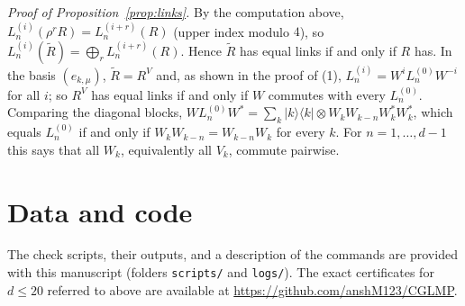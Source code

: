 \documentclass[11pt]{amsart}
\theoremstyle{definition}
\theoremstyle{remark}
\begin{document}
\emph{Proof of Proposition~\ref{prop:links}.} By the computation above, $L^{(i)}_n(\rho^rR)=L^{(i+r)}_n(R)$ (upper index modulo
$4$), so $L^{(i)}_n(\widetilde R)=\bigoplus_rL^{(i+r)}_n(R)$. Hence $\widetilde R$ has equal links if and only if $R$ has.
In the basis $(e_{k,\mu})$, $\widetilde R=R^V$ and, as shown in the proof of (1), $L^{(i)}_n=W^iL^{(0)}_nW^{-i}$ for all $i$;
so $R^V$ has equal links if and only if $W$ commutes with every $L^{(0)}_n$. Comparing the diagonal blocks,
$WL^{(0)}_nW^*=\sum_k|k\rangle\langle k|\otimes W_kW_{k-n}W_k^*W_k^*$, which equals $L^{(0)}_n$ if and only if
$W_kW_{k-n}=W_{k-n}W_k$ for every $k$. For $n=1,\dots,d-1$ this says that all $W_k$, equivalently all $V_k$, commute
pairwise.

\section*{Data and code}
The check scripts, their outputs, and a description of the commands are provided with this manuscript
(folders \texttt{scripts/} and \texttt{logs/}). The exact certificates for $d\le20$ referred to above are available
at \url{https://github.com/anshM123/CGLMP}.
\end{document}
